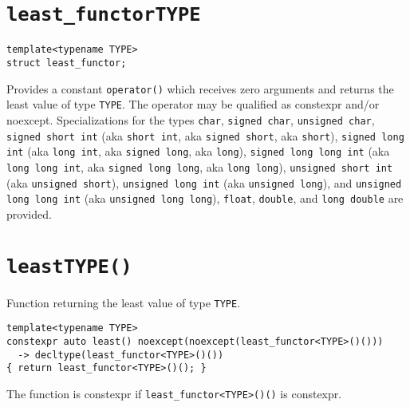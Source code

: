 \section{\texttt{least\_functor\textlangle TYPE\textrangle}}
\begin{verbatim}
template<typename TYPE>
struct least_functor;
\end{verbatim}
Provides a constant \texttt{operator()} which receives zero arguments and returns
the
least
value of type \texttt{TYPE}. The operator may be qualified as constexpr
and/or noexcept. Specializations for the types
\texttt{char},
\texttt{signed char},
\texttt{unsigned char},
\texttt{signed short int}       (aka \texttt{short int},     aka \texttt{signed short},     aka \texttt{short}),
\texttt{signed long int}        (aka \texttt{long int},      aka \texttt{signed long},      aka \texttt{long}),
\texttt{signed long long int}   (aka \texttt{long long int}, aka \texttt{signed long long}, aka \texttt{long long}),
\texttt{unsigned short int}     (aka \texttt{unsigned short}),
\texttt{unsigned long int}      (aka \texttt{unsigned long}), and
\texttt{unsigned long long int} (aka \texttt{unsigned long long}),
\texttt{float},
\texttt{double}, and
\texttt{long double}
are provided.

\section{\texttt{least\textlangle TYPE\textrangle()}}
Function returning the least value of type \texttt{TYPE}.
\begin{verbatim}
template<typename TYPE>
constexpr auto least() noexcept(noexcept(least_functor<TYPE>()()))
  -> decltype(least_functor<TYPE>()())
{ return least_functor<TYPE>()(); }
\end{verbatim}
The function is constexpr if \verb+least_functor<TYPE>()()+ is constexpr.
